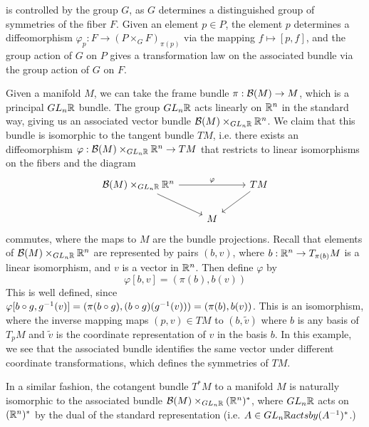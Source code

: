 is controlled by the group $G$, as $G$ determines a distinguished
group of symmetries of the fiber $F$. Given an element $p \in P$, the element
$p$ determines a diffeomorphism $\varphi_p : F \to (P \times_G F)_{\pi(p)}$ via the
mapping $f \mapsto [p,f]$, and the group action of $G$ on $P$ gives a
transformation law on the associated bundle via the group action of $G$ on $F$.
%
\begin{exmp}
Given a manifold $M$, we can take the frame bundle $\pi : \mathcal{B}(M) \to M$, which is a
principal $GL_n\mathbb{R}$ bundle. The group $GL_n\mathbb{R}$ acts linearly on $\mathbb{R}^n$ in the
standard way, giving us an associated vector bundle $\mathcal{B}(M) \times_{GL_n\mathbb{R}} \mathbb{R}^n$.
We claim that this bundle is isomorphic to the tangent bundle $TM$, i.e. there
exists an diffeomorphism $\varphi : \mathcal{B}(M) \times_{GL_n\mathbb{R}} \mathbb{R}^n \to TM$ that
restricts to linear isomorphisms on the fibers and the diagram
\[\begin{tikzcd}
\B(M) \times_{GL_n\R} \R^n \ar[rr, "\varphi"] \ar[dr] && TM \ar[dl] \\
& M
\end{tikzcd}\]
commutes, where the maps to $M$ are the bundle projections. Recall that
elements of $\mathcal{B}(M) \times_{GL_n\mathbb{R}} \mathbb{R}^n$ are represented by pairs $(b, v)$,
where $b: \mathbb{R}^n \to T_{\pi(b)}M$ is a linear isomorphism, and $v$ is a vector in $\mathbb{R}^n$.
Then define $\varphi$ by
\[
 \varphi[b,v] = (\pi(b), b(v))
\]
This is well defined, since $\varphi[b\circ g, g^{-1}(v)] = (\pi(b \circ g),
(b\circ g)(g^{-1}(v))) = (\pi(b), b(v))$. This is an isomorphism, where the
inverse mapping maps $(p,v) \in TM$ to $(b, \tilde{v})$ where $b$ is any
basis of $T_pM$ and $\tilde{v}$ is the coordinate representation of $v$ in the
basis $b$. In this example, we see that the associated bundle identifies the same vector
under different coordinate transformations, which defines the symmetries of
$TM$.
\end{exmp}
%
In a similar fashion, the cotangent bundle $T^*M$ to a manifold $M$ is
naturally isomorphic to the associated bundle $\mathcal{B}(M) \times_{GL_n\mathbb{R}} (\mathbb{R}^n)^*$,
where $GL_n\mathbb{R}$ acts on $(\mathbb{R}^n)^*$ by the dual of the standard representation
(i.e. $A \in GL_n\mathbb{R} acts by (A^{-1})^*$.) \\
%

